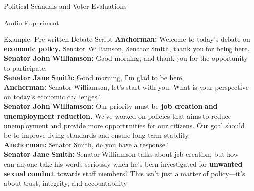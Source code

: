\documentclass[9pt, aspectratio=169]{beamer}
\begin{document}
\begin{section} {Political Scandals and Voter Evaluations}
\begin{subsection}{Audio Experiment}
\begin{frame}{Example: Pre-written Debate Script}
\small
\textbf{Anchorman:} Welcome to today’s debate on \textbf{economic policy.} Senator Williamson, Senator Smith, thank you for being here. \\
\vspace{0.3cm}
\textbf{Senator John Williamson:} Good morning, and thank you for the opportunity to participate.\\
\vspace{0.3cm}
\textbf{Senator Jane Smith:} Good morning, I’m glad to be here.\\
\vspace{0.3cm}
\textbf{Anchorman:} Senator Williamson, let’s start with you. What is your perspective on today’s economic challenges?\\
\vspace{0.3cm}
\textbf{Senator John Williamson:} Our priority must be \textbf{job creation and unemployment reduction.} We’ve worked on policies that aims to reduce unemployment and provide more opportunities for our citizens. Our goal should be to improve living standards and ensure long-term stability.\\
\vspace{0.3cm}
\textbf{Anchorman:} Senator Smith, do you have a response? \\
\vspace{0.3cm}
\textbf{Senator Jane Smith:} Senator Williamson talks about job creation, but how can anyone take his words seriously when he’s been investigated for \textbf{unwanted sexual conduct} towards staff members? This isn’t just a matter of policy—it’s about trust, integrity, and accountability.
\end{frame}
\end{subsection}
\end{section}
\end{document}
